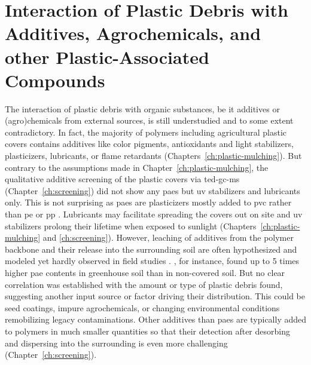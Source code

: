 \section[Interaction of Plastic Debris with Plastic-Associated Compounds]{Interaction of Plastic Debris with Additives, Agrochemicals, and other Plastic-Associated Compounds}
\label{sec:general-discussion:pacs}

The interaction of plastic debris with organic substances, be it additives or (agro)\-chemicals from external sources, is still understudied and to some extent contradictory.
In fact, the majority of polymers including agricultural plastic covers contains additives like color pigments, antioxidants and light stabilizers, plasticizers, lubricants, or flame retardants (Chapters~\ref{ch:plastic-mulching}). But contrary to the assumptions made in Chapter~\ref{ch:plastic-mulching}, the qualitative additive screening of the plastic covers via \ac{ted-gc-ms} (Chapter~\ref{ch:screening}) did not show any \acp{pae} but \ac{uv} stabilizers and lubricants only. This is not surprising as \acp{pae} are plasticizers mostly added to \ac{pvc} rather than \ac{pe} or \ac{pp} \citep{WaltersPlasticizers2020}. Lubricants may facilitate spreading the covers out on site and \ac{uv} stabilizers prolong their lifetime when exposed to sunlight (Chapters~\ref{ch:plastic-mulching} and \ref{ch:screening}).
However, leaching of additives from the polymer backbone and their release into the surrounding soil are often hypothesized \citep[Chapter~\ref{ch:plastic-mulching};][]{PathanSoil2020,ZhangTransport2020} and modeled \citep{ZhangAgricultural2021} yet hardly observed in field studies \citep{QiBehavior2020}.
, for instance, found up to \num{5} times higher \ac{pae} contents in greenhouse soil than in non-covered soil. But no clear correlation was established with the amount or type of plastic debris found, suggesting another input source or factor driving their distribution. This could be seed coatings, impure agrochemicals, or changing environmental conditions remobilizing legacy contaminations.
Other additives than \acp{pae} are typically added to polymers in much smaller quantities \citep{HahladakisOverview2018} so that their detection after desorbing and dispersing into the surrounding is even more challenging (Chapter~\ref{ch:screening}).

